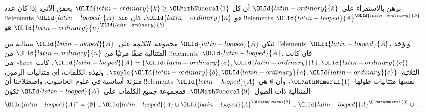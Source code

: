 \documentclass[../../../include/open-logic-section]{subfiles}
\begin{document}
\begin{prob}
برهن بالاستقراء على~$\OLId{latin-ordinary}{k}$ أن كل $\OLId{latin-ordinary}{k} \ge \OLMathNumeral{1}$ يحقق الآتي: إذا كان عدد
!!{element}s $\OLId{latin-looped}{A}$ هو $\OLId{latin-ordinary}{n}$، كان عدد !!{element}s $\OLId{latin-looped}{A}^\OLId{latin-ordinary}{k}$ هو $\OLId{latin-ordinary}{n}^\OLId{latin-ordinary}{k}$.
\end{prob}

\begin{ex}
لتكن $\OLId{latin-looped}{A}$ مجموعة. \emph{الكلمة} على~$\OLId{latin-looped}{A}$ متتالية من !!{element}s~$\OLId{latin-looped}{A}$، وتؤخذ
المتتالية صفًا مرتبًا من $\OLId{latin-ordinary}{n}$ من !!{element}s~$\OLId{latin-looped}{A}$. فإن كانت
$\OLId{latin-looped}{A} = \{\OLId{latin-ordinary}{a}, \OLId{latin-ordinary}{b}, \OLId{latin-ordinary}{c}\}$، كانت «$bac$» هي الثلاثية~$\tuple{\OLId{latin-ordinary}{b}, \OLId{latin-ordinary}{a}, \OLId{latin-ordinary}{c}}$.
ولهذه الكلمات، أي متتاليات الرموز، منزلة أساسية في علوم الحاسوب.
واصطلاحنا أن !!{element}s~$\OLId{latin-looped}{A}$ نفسها متتاليات طولها~$\OLMathNumeral{1}$، وأن
$\emptyset$ هي المتتالية ذات الطول~$\OLMathNumeral{0}$. فمجموعة \emph{جميع} الكلمات
على~$\OLId{latin-looped}{A}$ تكون
\[
\OLId{latin-looped}{A}^* = \{\emptyset\} \cup \OLId{latin-looped}{A} \cup \OLId{latin-looped}{A}^\OLMathNumeral{2} \cup \OLId{latin-looped}{A}^\OLMathNumeral{3} \cup \dots
\]
\end{ex}
\end{document}
